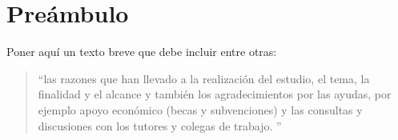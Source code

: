 
\chapter*{Preámbulo}
\thispagestyle{empty}
Poner aquí un texto breve que debe incluir entre otras:
\begin{quote}
``las razones que han llevado a la realización del estudio, el tema, la finalidad y el alcance y también los agradecimientos por las ayudas, por ejemplo apoyo económico (becas y subvenciones) y las consultas y discusiones con los tutores y colegas de trabajo. \citep{UNE50136:97}''
\end{quote}






